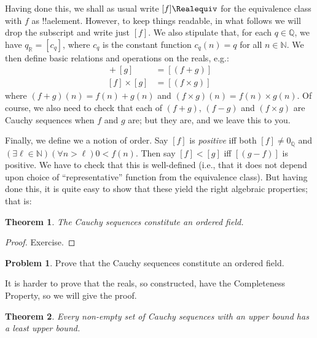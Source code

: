 \documentclass[10pt,a4paper]{article}
\theoremstyle{plain}
\newtheorem{thm}{Theorem}[section]
\theoremstyle{definition}
\newtheorem{prob}{Problem}[section]
\theoremstyle{remark}
\newcommand*{\ollabel}[1]{\label{#1}}
\providecommand{\lif}{\mathbin{\rightarrow}}
\providecommand{\Nat}{\ensuremath{\mathbb{N}}}
\providecommand{\equivrep}[1]{[#1]}
\providecommand{\Rat}{\mathbb{Q}}
\providecommand{\Real}{\mathbb{R}}
\begin{document}
Having done this, we shall as usual write $\equivrep{f}{\Realequiv}$
for the equivalence class with $f$ as !!a{element}. However, to keep
things readable, in what follows we will drop the subscript and write
just $\equivrep{f}{}$. We also stipulate that, for each $q \in \Rat$,
we have $q_{\Real} = \equivrep{c_{q}}{}$, where $c_{q}$ is the
constant function $c_q(n) = q$ for all $n \in \Nat$. We then define
basic relations and operations on the reals, e.g.:
\begin{align*}
	\equivrep{f}{} + \equivrep{g}{} &= 	\equivrep{(f + g)}{} \\
	\equivrep{f}{} \times 	\equivrep{g}{} &= \equivrep{(f \times g)}{} 
\end{align*}
where $(f + g)(n) = f(n) + g(n)$ and $(f \times g)(n) = f(n) \times
g(n)$. Of course, we also need to check that each of  $(f + g)$,
$(f-g)$ and $(f\times g)$ are Cauchy sequences when $f$ and $g$ are;
but they are, and we leave this to you.

Finally, we define we a notion of order. Say $\equivrep{f}{}$ is
\emph{positive} iff both $\equivrep{f}{}\neq 0_\Rat$ and $(\exists
\ell \in \Nat)(\forall n > \ell)0 < f(n)$. Then say $\equivrep{f}{} <
\equivrep{g}{}$ iff $\equivrep{(g - f)}{}$ is positive. We have to
check that this is well-defined (i.e., that it does not depend upon
choice of ``representative'' function from the equivalence class). 
But having done this, it is quite easy to show that these yield the
right algebraic properties; that is:
\begin{thm}\ollabel{thm:cauchyorderedfield}
The Cauchy sequences constitute an ordered field.
\end{thm}

\begin{proof}
Exercise. 
\end{proof}

\begin{prob}
Prove that the Cauchy sequences constitute an ordered field.
\end{prob}

It is harder to prove that the reals, so constructed, have the
Completeness Property, so we will give the proof.

\begin{thm}
Every non-empty set of Cauchy sequences with an upper bound has a
least upper bound.
\end{thm}
\end{document}
